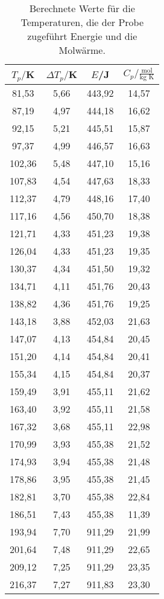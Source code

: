 \begin{table}[htp]
	\begin{center}
    \caption{Berechnete Werte für die Temperaturen, die der Probe zugeführt Energie und die
    Molwärme.}
    \label{tab:ref}
		\begin{tabular}{cccc}
		\toprule
			{$T_p/$K} & {$\Delta T_p/$K} & {$E$/J} & {$C_p/\frac{\text{mol}}{\text{kg K}}$}\\
			\midrule
			81,53 & 5,66 & 443,92 & 14,57\\
			87,19 & 4,97 & 444,18 & 16,62\\
			92,15 & 5,21 & 445,51 & 15,87\\
			97,37 & 4,99 & 446,57 & 16,63\\
			102,36 & 5,48 & 447,10 & 15,16\\
			107,83 & 4,54 & 447,63 & 18,33\\
			112,37 & 4,79 & 448,16 & 17,40\\
			117,16 & 4,56 & 450,70 & 18,38\\
			121,71 & 4,33 & 451,23 & 19,38\\
			126,04 & 4,33 & 451,23 & 19,35\\
			130,37 & 4,34 & 451,50 & 19,32\\
			134,71 & 4,11 & 451,76 & 20,43\\
			138,82 & 4,36 & 451,76 & 19,25\\
			143,18 & 3,88 & 452,03 & 21,63\\
			147,07 & 4,13 & 454,84 & 20,45\\
			151,20 & 4,14 & 454,84 & 20,41\\
			155,34 & 4,15 & 454,84 & 20,37\\
			159,49 & 3,91 & 455,11 & 21,62\\
			163,40 & 3,92 & 455,11 & 21,58\\
			167,32 & 3,68 & 455,11 & 22,98\\
			170,99 & 3,93 & 455,38 & 21,52\\
			174,93 & 3,94 & 455,38 & 21,48\\
			178,86 & 3,95 & 455,38 & 21,45\\
			182,81 & 3,70 & 455,38 & 22,84\\
			186,51 & 7,43 & 455,38 & 11,39\\
			193,94 & 7,70 & 911,29 & 21,99\\
			201,64 & 7,48 & 911,29 & 22,65\\
			209,12 & 7,25 & 911,29 & 23,35\\
			216,37 & 7,27 & 911,83 & 23,30\\

\end{tabular}
\end{center}
\end{table}

